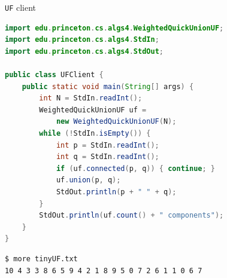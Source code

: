 \documentclass[8pt,a4paper,compress]{beamer}
\begin{document}
\begin{frame}[fragile]
\begin{minipage}{250pt}
\pause

\lstinline{UF} client

\smallskip

\begin{lstlisting}[language=Java,style=focusin]
import edu.princeton.cs.algs4.WeightedQuickUnionUF;
import edu.princeton.cs.algs4.StdIn;
import edu.princeton.cs.algs4.StdOut;

public class UFClient {
    public static void main(String[] args) {
        int N = StdIn.readInt();
        WeightedQuickUnionUF uf = 
            new WeightedQuickUnionUF(N);
        while (!StdIn.isEmpty()) {
            int p = StdIn.readInt();
            int q = StdIn.readInt();
            if (uf.connected(p, q)) { continue; }
            uf.union(p, q);
            StdOut.println(p + " " + q);
        }
        StdOut.println(uf.count() + " components");
    }
}
\end{lstlisting}
    
\pause

\begin{lstlisting}[language={},style=focusin]
$ more tinyUF.txt
10 4 3 3 8 6 5 9 4 2 1 8 9 5 0 7 2 6 1 1 0 6 7
\end{lstlisting}    

\pause


\end{minipage}
\end{frame}
\end{document}
